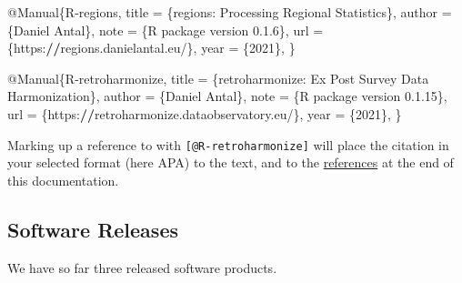 \documentclass[
  fontsize=13pt,
  english,
  a4paper,
  openany, a4paper, oneside]{article}
\newenvironment{Shaded}{\begin{snugshade}}{\end{snugshade}}
\newcommand{\DecValTok}[1]{\textcolor[rgb]{0.00,0.00,0.81}{#1}}
\newcommand{\ErrorTok}[1]{\textcolor[rgb]{0.64,0.00,0.00}{\textbf{#1}}}
\newcommand{\FloatTok}[1]{\textcolor[rgb]{0.00,0.00,0.81}{#1}}
\newcommand{\NormalTok}[1]{#1}
\newcommand{\OtherTok}[1]{\textcolor[rgb]{0.56,0.35,0.01}{#1}}
\newcommand{\SpecialCharTok}[1]{\textcolor[rgb]{0.00,0.00,0.00}{#1}}
\begin{document}
\begin{Shaded}
\begin{Highlighting}[]
\SpecialCharTok{@}\NormalTok{Manual\{R}\SpecialCharTok{{-}}\NormalTok{regions,}
\NormalTok{  title }\OtherTok{=}\NormalTok{ \{regions}\SpecialCharTok{:}\NormalTok{ Processing Regional Statistics\},}
\NormalTok{  author }\OtherTok{=}\NormalTok{ \{Daniel Antal\},}
\NormalTok{  note }\OtherTok{=}\NormalTok{ \{R package version }\DecValTok{0}\NormalTok{.}\FloatTok{1.6}\NormalTok{\},}
\NormalTok{  url }\OtherTok{=}\NormalTok{ \{https}\SpecialCharTok{:}\ErrorTok{//}\NormalTok{regions.danielantal.eu}\SpecialCharTok{/}\NormalTok{\},}
\NormalTok{  year }\OtherTok{=}\NormalTok{ \{}\DecValTok{2021}\NormalTok{\},}
\NormalTok{\}}

\SpecialCharTok{@}\NormalTok{Manual\{R}\SpecialCharTok{{-}}\NormalTok{retroharmonize,}
\NormalTok{  title }\OtherTok{=}\NormalTok{ \{retroharmonize}\SpecialCharTok{:}\NormalTok{ Ex Post Survey Data Harmonization\},}
\NormalTok{  author }\OtherTok{=}\NormalTok{ \{Daniel Antal\},}
\NormalTok{  note }\OtherTok{=}\NormalTok{ \{R package version }\DecValTok{0}\NormalTok{.}\FloatTok{1.15}\NormalTok{\},}
\NormalTok{  url }\OtherTok{=}\NormalTok{ \{https}\SpecialCharTok{:}\ErrorTok{//}\NormalTok{retroharmonize.dataobservatory.eu}\SpecialCharTok{/}\NormalTok{\},}
\NormalTok{  year }\OtherTok{=}\NormalTok{ \{}\DecValTok{2021}\NormalTok{\},}
\NormalTok{\}}
\end{Highlighting}
\end{Shaded}

Marking up a reference to \citep{R-retroharmonize} with \texttt{{[}@R-retroharmonize{]}} will place the citation in your selected format (here APA) to the text, and to the \protect\hyperlink{references}{references} at the end of this documentation.

\hypertarget{software-releases}{%
\subsection{Software Releases}\label{software-releases}}

We have so far three released software products.
\end{document}
